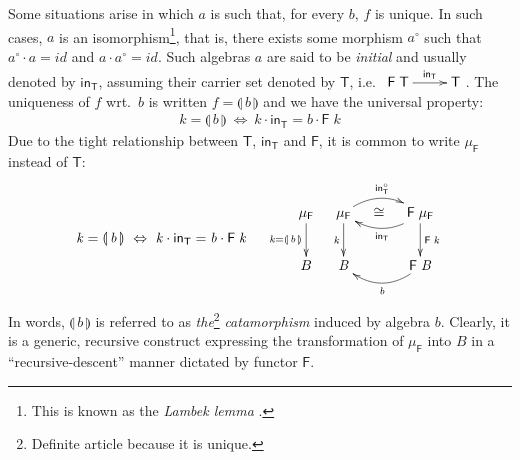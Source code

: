 \documentclass{elsarticle}
\newcommand{\Conid}[1]{\mathit{#1}}
\newcommand{\Varid}[1]{\mathit{#1}}
\def\comp{ \mathbin{\cdot} }
\def\conv#1{#1^\circ}
\def\fun#1{\mathsf{#1}}
\def\muF{\mu_{\fun F}}
\def\iso{\cong}
\def\rarrow#1#2#3{\xymatrix{ #1 \ar[r]^-{#2} & #3 }}
\def\muF{\mu_{\fun F}}
\begin{document}
Some situations arise in which \ensuremath{\Varid{a}} is such that, for every \ensuremath{\Varid{b}}, \ensuremath{\Varid{f}} is unique.
In such cases, \ensuremath{\Varid{a}} is an isomorphism\footnote{This is known as the \emph{Lambek lemma}
\cite{BM97}.}, that is, there exists some morphism \ensuremath{\conv{\Varid{a}}} such that
\ensuremath{\conv{\Varid{a}} \comp \Varid{a}\mathrel{=}{id}} and \ensuremath{\Varid{a} \comp \conv{\Varid{a}}\mathrel{=}{id}}. Such algebras \ensuremath{\Varid{a}} are said to be \emph{initial}
and usually denoted by \ensuremath{\mathsf{in}_{\fun T}}, assuming their carrier set denoted by \ensuremath{\fun T }, i.e.\
\ensuremath{\rarrow{\fun F \;\fun T }{\mathsf{in}_{\fun T}}{\fun T }}. The uniqueness of \ensuremath{\Varid{f}} wrt.\ \ensuremath{\Varid{b}} is written \ensuremath{\Varid{f}\mathrel{=}\llparenthesis\,\Varid{b}\,\rrparenthesis} and
we have the universal property: 
\begin{eqnarray*}
	\ensuremath{\Varid{k}\mathrel{=}\llparenthesis\,\Varid{b}\,\rrparenthesis~\Leftrightarrow~\Varid{k} \comp \mathsf{in}_{\fun T}\mathrel{=}\Varid{b} \comp \fun F \;\Varid{k}}
\end{eqnarray*}
Due to the tight relationship between \ensuremath{\fun T }, \ensuremath{\mathsf{in}_{\fun T}} and \ensuremath{\fun F }, it is common to write 
\ensuremath{\muF } instead of \ensuremath{\fun T }:
\begin{eqnarray}
	\ensuremath{\Varid{k}\mathrel{=}\llparenthesis\,\Varid{b}\,\rrparenthesis~\Leftrightarrow~\Varid{k} \comp \mathsf{in}_{\fun T}\mathrel{=}\Varid{b} \comp \fun F \;\Varid{k}}
~~~~  \vcenter{\xymatrix@C=1em{
	\ensuremath{\muF }
 		\ar[d]_{\ensuremath{\Varid{k}\mathrel{=}\llparenthesis\,\Varid{b}\,\rrparenthesis}}
&
	\ensuremath{\muF }
 		\ar@/^0.9pc/[rr]^{\ensuremath{\conv{\mathsf{in}_{\fun T}}}}
 		\ar[d]_{\ensuremath{\Varid{k}}}
&
        \iso
&
	\ensuremath{\fun F \;\muF }
 		\ar@/^0.9pc/[ll]^{\ensuremath{\mathsf{in}_{\fun T}}}
 		\ar[d]^{\ensuremath{\fun F \;\Varid{k}}}
\\
	B
&
	\ensuremath{\Conid{B}}
&&
	\ensuremath{\fun F \;\Conid{B}}
 		\ar@/^1pc/[ll]^{\ensuremath{\Varid{b}}}
}}
	\label{eq:cataUniv}
\end{eqnarray}
In words, \ensuremath{\llparenthesis\,\Varid{b}\,\rrparenthesis} is referred to as \emph{the}\footnote{Definite article because it is unique.}
\emph{catamorphism} induced by algebra \ensuremath{\Varid{b}}. Clearly, it is a generic, recursive
construct expressing the transformation of \ensuremath{\muF } into \ensuremath{\Conid{B}} in a ``recursive-descent''
manner dictated by functor \ensuremath{\fun F }.
\end{document}

